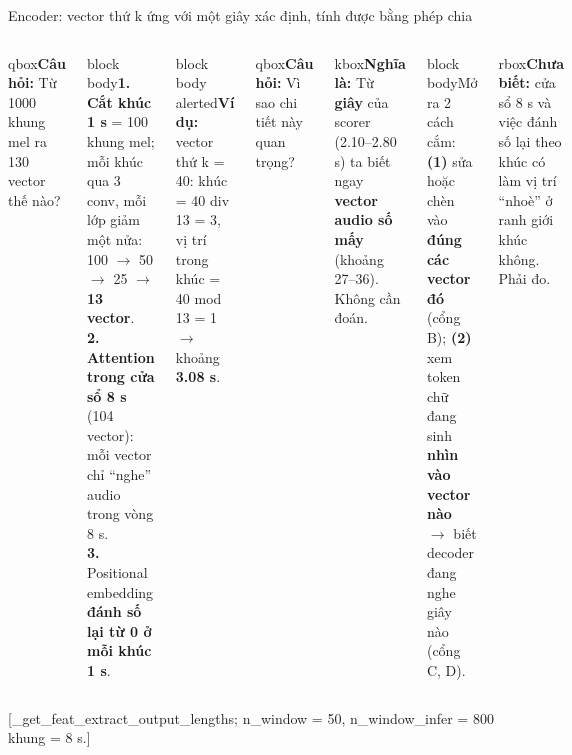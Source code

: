 \documentclass[aspectratio=169,xcolor=table]{beamer}
\newcommand{\src}[1]{\par\vfill{\tiny\color{TextGray}[#1]}}
\newcommand{\ra}{$\rightarrow$}
\newcommand{\bsz}{\footnotesize}%
\newcommand{\nbox}[2][block body]{\begin{beamercolorbox}[sep=0.45em,rounded=true]{#1}\bsz #2\end{beamercolorbox}}
\newcommand{\cauhoi}[1]{\begin{beamercolorbox}[sep=0.30em,rounded=true]{qbox}\bsz\textbf{Câu hỏi:} #1\end{beamercolorbox}\vspace{0.08cm}}
\newcommand{\nghiala}[1]{\begin{beamercolorbox}[sep=0.32em,rounded=true]{kbox}\bsz\textbf{Nghĩa là:} #1\end{beamercolorbox}}
\newcommand{\yeu}[1]{\begin{beamercolorbox}[sep=0.40em,rounded=true]{rbox}\bsz #1\end{beamercolorbox}}
\begin{document}
\begin{frame}{Encoder: vector thứ k ứng với một giây xác định, tính được bằng phép chia}
\begin{columns}[T]
\cauhoi{Từ 1000 khung mel ra 130 vector thế nào?}
\nbox{\textbf{1. Cắt khúc 1 s} = 100 khung mel; mỗi khúc qua 3 conv, mỗi lớp giảm một nửa: 100 \ra{} 50 \ra{} 25 \ra{} \textbf{13 vector}.\\[2pt]
\textbf{2. Attention trong cửa sổ 8 s} (104 vector): mỗi vector chỉ ``nghe'' audio trong vòng 8 s.\\[2pt]
\textbf{3.} Positional embedding \textbf{đánh số lại từ 0 ở mỗi khúc 1 s}.}
\vspace{0.08cm}
\nbox[block body alerted]{\textbf{Ví dụ:} vector thứ k = 40: khúc = 40 div 13 = 3, vị trí trong khúc = 40 mod 13 = 1 \ra{} khoảng \textbf{3.08 s}.}
\cauhoi{Vì sao chi tiết này quan trọng?}
\nghiala{Từ \textbf{giây} của scorer (2.10--2.80 s) ta biết ngay \textbf{vector audio số mấy} (khoảng 27--36). Không cần đoán.}
\vspace{0.08cm}
\nbox{Mở ra 2 cách cắm: \textbf{(1)} sửa hoặc chèn vào \textbf{đúng các vector đó} (cổng B); \textbf{(2)} xem token chữ đang sinh \textbf{nhìn vào vector nào} \ra{} biết decoder đang nghe giây nào (cổng C, D).}
\vspace{0.08cm}
\yeu{\textbf{Chưa biết:} cửa sổ 8 s và việc đánh số lại theo khúc có làm vị trí ``nhoè'' ở ranh giới khúc không. Phải đo.}
\end{columns}
\src{\_get\_feat\_extract\_output\_lengths; n\_window = 50, n\_window\_infer = 800 khung = 8 s.}
\end{frame}
\end{document}
